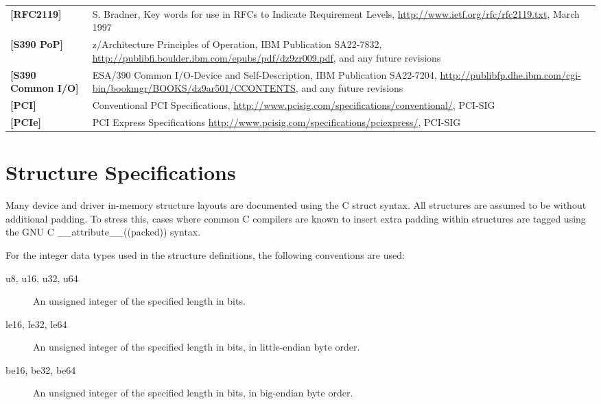 \begin{longtable}{l p{5in}}
	\label{intro:rfc2119}\textbf{[RFC2119]} & S. Bradner, Key words for use in RFCs to Indicate Requirement Levels, \newline\url{http://www.ietf.org/rfc/rfc2119.txt}, March 1997\\
	\label{intro:S390 PoP}\textbf{[S390 PoP]} & z/Architecture Principles of Operation, IBM Publication SA22-7832, \newline\url{http://publibfi.boulder.ibm.com/epubs/pdf/dz9zr009.pdf}, and any future revisions\\
	\label{intro:S390 Common I/O}\textbf{[S390 Common I/O]} & ESA/390 Common I/O-Device and Self-Description, IBM Publication SA22-7204, \newline\url{http://publibfp.dhe.ibm.com/cgi-bin/bookmgr/BOOKS/dz9ar501/CCONTENTS}, and any future revisions\\
	\label{intro:PCI}\textbf{[PCI]} &
	Conventional PCI Specifications,
	\newline\url{http://www.pcisig.com/specifications/conventional/},
	PCI-SIG\\
	\label{intro:PCIe}\textbf{[PCIe]} &
	PCI Express Specifications
	\newline\url{http://www.pcisig.com/specifications/pciexpress/},
	PCI-SIG\\
\end{longtable}

\section{Structure Specifications}

Many device and driver in-memory structure layouts are documented using
the C struct syntax. All structures are assumed to be without additional
padding. To stress this, cases where common C compilers are known to insert
extra padding within structures are tagged using the GNU C
__attribute__((packed))  syntax.

For the integer data types used in the structure definitions, the following
conventions are used:

\begin{description}
\item[u8, u16, u32, u64] An unsigned integer of the specified length in bits.

\item[le16, le32, le64] An unsigned integer of the specified length in bits,
in little-endian byte order.

\item[be16, be32, be64] An unsigned integer of the specified length in bits,
in big-endian byte order.
\end{description}

\newpage

